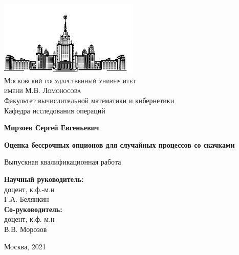 \documentclass[a4paper,12pt]{article}
\theoremstyle{definition}
\begin{document}
\begin{center}
\ \vspace{-2cm}

\includegraphics[width=0.5\textwidth]{img/msu.jpg}\\
{\scshape Московский государственный университет \\ имени М.В. Ломоносова}\\
Факультет вычислительной математики и кибернетики\\
Кафедра исследования операций

\vspace{4cm}

\textbf{{\Large Мирзоев Сергей Евгеньевич}}

\vspace{1cm}

{\Huge\bfseries
Оценка бессрочных опционов для случайных процессов со скачками\\}
\end{center}

\vspace{1cm}
\begin{center}
{\normalsize Выпускная квалификационная работа}
\end{center}

\vspace{2cm}

\vfill

\begin{flushright}
\normalsize
\textbf{Научный руководитель:}\\
доцент, к.ф.-м.н\\
Г.А. Белянкин\\
\textbf{Со-руководитель:}\\
доцент, к.ф.-м.н\\
В.В. Морозов
\end{flushright}

\vfill

\begin{center}
Москва, 2021
\end{center}
\end{document}
